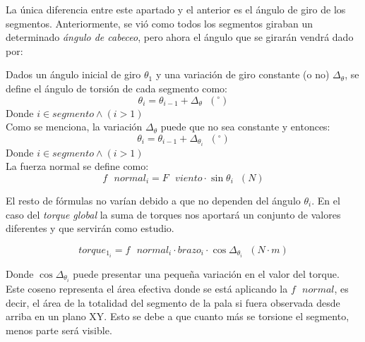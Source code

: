 La única diferencia entre este apartado y el anterior es el ángulo de giro de los segmentos. Anteriormente, se vió como todos los segmentos giraban un determinado \textit{ángulo de cabeceo}, pero ahora el ángulo que se girarán vendrá dado por:

Dados un ángulo inicial de giro $\theta_1 $ y una variación de giro constante (o no) $\Delta_\theta$, se define el ángulo de torsión de cada segmento como:
\begin{equation}
\theta_i = \theta_{i-1} + \Delta_\theta \hspace{7pt} (^{\circ})
\label{def:theta_cte}
\end{equation}
Donde $i \in segmento \wedge (i > 1)$\\


Como se menciona, la variación $\Delta_\theta$ puede que no sea constante y entonces:
\begin{equation}
\theta_i = \theta_{i-1} + \Delta_{\theta_{i}}  \hspace{7pt} (^{\circ})
\label{def:theta_nocte}
\end{equation}
Donde $i \in segmento \wedge (i > 1)$\\

La fuerza normal se define como:
\begin{equation}
   f \text{ } normal_i = F \text{ } viento \cdot \sin{\theta_i} \hspace{7pt} (N)
  \label{def:fuerza_normal_torsion}
 \end{equation}

El resto de fórmulas no varían debido a que no dependen del ángulo $\theta_i$. En el caso del \textit{torque global} la suma de torques nos aportará un conjunto de valores diferentes y que servirán como estudio.

  \begin{equation}
  torque_{1_i} = f \text{ } normal_i \cdot brazo_i \cdot \cos{\Delta_{\theta_{i}}} \hspace{7pt} (N \cdot m)
 \label{def:torque_algebraico_torsion}
 \end{equation}
 
Donde $ \cos{\Delta_{\theta_{i}}} $ puede presentar una pequeña variación en el valor del torque. Este coseno representa el área efectiva donde se está aplicando la $ f \text{ } normal $, es decir, el área de la totalidad del segmento de la pala si fuera observada desde arriba en un plano XY. Esto se debe a que cuanto más se torsione el segmento, menos parte será visible.\\

